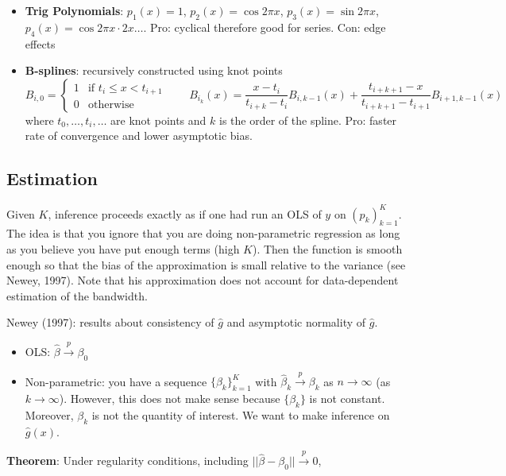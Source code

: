 \documentclass[12pt,]{book}
\providecommand{\tightlist}{%
  \setlength{\itemsep}{0pt}\setlength{\parskip}{0pt}}
\begin{document}
\begin{itemize}
\item
  \textbf{Trig Polynomials}: \(p_1(x) = 1\), \(p_2(x) = \cos 2 \pi x\), \(p_3(x)= \sin 2 \pi x\), \(p_4(x) = \cos 2 \pi x \cdot 2 x \dots\). Pro: cyclical therefore good for series. Con: edge effects
\item
  \textbf{B-splines}: recursively constructed using knot points
  \[
  B_{i, 0} = \begin{cases}
  1 & \text{if } t_i \leq x < t_{i+1} \\ 0 & \text{otherwise}
  \end{cases} \qquad B_{i_k} (x) = \frac{x - t_i}{ t_{i+k} - t_i} B_{i, k-1} (x) +  \frac{t_{i+k+1}-x}{t_{i+k+1} - t_{i+1}} B_{i+1, k-1} (x)
  \]
  where \(t_0, \dots, t_i, \dots\) are knot points and \(k\) is the order of the spline.
  Pro: faster rate of convergence and lower asymptotic bias.
\end{itemize}

\hypertarget{estimation}{%
\subsection{Estimation}\label{estimation}}

Given \(K\), inference proceeds exactly as if one had run an OLS of \(y\) on \((p_k)_{k=1}^K\). The idea is that you ignore that you are doing non-parametric regression as long as you believe you have put enough terms (high \(K\)). Then the function is smooth enough so that the bias of the approximation is small relative to the variance (see Newey, 1997). Note that his approximation does not account for data-dependent estimation of the bandwidth.

Newey (1997): results about consistency of \(\hat{g}\) and asymptotic normality of \(\hat{g}\).

\begin{itemize}
\tightlist
\item
  OLS: \(\hat{\beta} \overset{p}{\to} \beta_0\)
\item
  Non-parametric: you have a sequence \(\{\beta_k\}_{k=1}^K\) with \(\hat{\beta}_k \overset{p}{\to} \beta_k\) as \(n \to \infty\) (as \(k \to \infty\)). However, this does not make sense because \(\{\beta_k\}\) is not constant. Moreover, \(\beta_k\) is not the quantity of interest. We want to make inference on \(\hat{g}(x)\).
\end{itemize}

\textbf{Theorem}:
Under regularity conditions, including \(| | \hat{\beta} - \beta_0 | | \overset{p}{\to} 0\),
\end{document}
